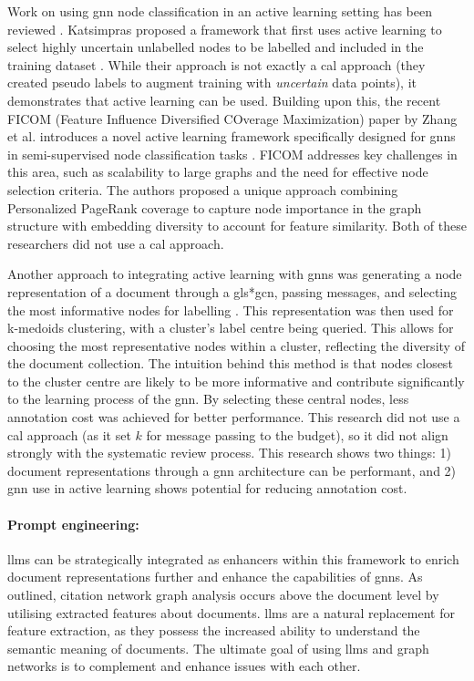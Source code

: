 \documentclass[10pt,oneside]{book}
\begin{document}
Work on using \gls*{gnn} node classification in an active learning setting has been reviewed \cite{madhawa_active_2020}. Katsimpras proposed a framework that first uses active learning to select highly uncertain unlabelled nodes to be labelled and included in the training dataset \cite{katsimpras_improving_2024}. While their approach is not exactly a \gls*{cal} approach (they created pseudo labels to augment training with \emph{uncertain} data points), it demonstrates that active learning can be used. Building upon this, the recent FICOM (Feature Influence Diversified COverage Maximization) paper by Zhang et al. introduces a novel active learning framework specifically designed for \gls*{gnn}s in semi-supervised node classification tasks \cite{zhang_ficom_2024}. FICOM addresses key challenges in this area, such as scalability to large graphs and the need for effective node selection criteria. The authors proposed a unique approach combining Personalized PageRank coverage to capture node importance in the graph structure with embedding diversity to account for feature similarity. Both of these researchers did not use a \gls*{cal} approach.

Another approach to integrating active learning with \gls*{gnn}s was generating a node representation of a document through a gls*{gcn}, passing messages, and selecting the most informative nodes for labelling \cite{wu_active_2021}. This representation was then used for k-medoids clustering, with a cluster's label centre being queried. This allows for choosing the most representative nodes within a cluster, reflecting the diversity of the document collection. The intuition behind this method is that nodes closest to the cluster centre are likely to be more informative and contribute significantly to the learning process of the \gls*{gnn}. By selecting these central nodes, less annotation cost was achieved for better performance. This research did not use a \gls*{cal} approach (as it set $k$ for message passing to the budget), so it did not align strongly with the systematic review process. This research shows two things: 1) document representations through a \gls*{gnn} architecture can be performant, and 2) \gls*{gnn} use in active learning shows potential for reducing annotation cost.

\paragraph{Prompt engineering: }

\gls*{llm}s can be strategically integrated as enhancers within this framework to enrich document representations further and enhance the capabilities of \gls*{gnn}s. As outlined, citation network graph analysis occurs above the document level by utilising extracted features about documents. \gls*{llm}s are a natural replacement for feature extraction, as they possess the increased ability to understand the semantic meaning of documents. The ultimate goal of using \gls*{llm}s and graph networks is to complement and enhance issues with each other. 
\end{document}
